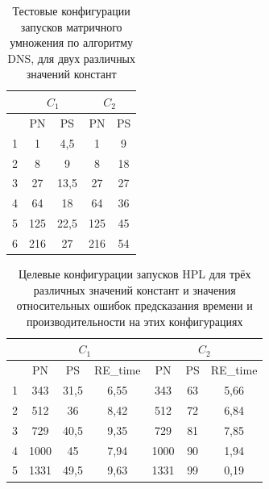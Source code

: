 			\begin{table}
				\begin{tabular}{|r||c|c||c|c|}
					\hline
					            & \multicolumn{2}{c||}{\(C_1\)} & \multicolumn{2}{c|}{\(C_2\)} \\ \hline
					\textnumero & PN  & PS                     & PN  & PS                      \\ \hline
					1           & 1   & 4,5                    & 1   & 9                       \\ \hline
					2           & 8   & 9                      & 8   & 18                      \\ \hline
					3           & 27  & 13,5                   & 27  & 27                      \\ \hline
					4           & 64  & 18                     & 64  & 36                      \\ \hline
					5           & 125 & 22,5                   & 125 & 45                      \\ \hline
					6           & 216 & 27                     & 216 & 54                      \\ \hline
				\end{tabular}
				\caption{Тестовые конфигурации запусков матричного умножения по алгоритму DNS, для двух различных значений констант}
				\label{test_HPL}
			\end{table}


			\begin{table}
				\begin{tabular}{|r||c|c|c||c|c|c|}
					\hline
					            & \multicolumn{3}{|c|}{\(C_1\)} & \multicolumn{3}{|c|}{\(C_2\)} \\ \hline
					\textnumero & PN   & PS   & RE\_time        & PN   & PS & RE\_time          \\ \hline
					1           & 343  & 31,5 & 6,55            & 343  & 63 & 5,66              \\ \hline
					2           & 512  & 36   & 8,42            & 512  & 72 & 6,84              \\ \hline
					3           & 729  & 40,5 & 9,35            & 729  & 81 & 7,85              \\ \hline
					4           & 1000 & 45   & 7,94            & 1000 & 90 & 1,94              \\ \hline
					5           & 1331 & 49,5 & 9,63            & 1331 & 99 & 0,19              \\ \hline
				\end{tabular}
				\caption{Целевые конфигурации запусков HPL для трёх различных значений констант и значения относительных ошибок предсказания времени и производительности на этих конфигурациях}
				\label{target_HPL}
			\end{table}

